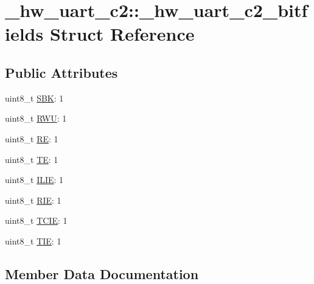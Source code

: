 \hypertarget{struct__hw__uart__c2_1_1__hw__uart__c2__bitfields}{}\section{\+\_\+hw\+\_\+uart\+\_\+c2\+:\+:\+\_\+hw\+\_\+uart\+\_\+c2\+\_\+bitfields Struct Reference}
\label{struct__hw__uart__c2_1_1__hw__uart__c2__bitfields}
\subsection*{Public Attributes}
\begin{DoxyCompactItemize}
\item 
uint8\+\_\+t \hyperlink{struct__hw__uart__c2_1_1__hw__uart__c2__bitfields_a04c3e2e389689b94e32be5cb78bbb247}{S\+BK}\+: 1
\item 
uint8\+\_\+t \hyperlink{struct__hw__uart__c2_1_1__hw__uart__c2__bitfields_a1a364a97336cba5d342508591b620b6e}{R\+WU}\+: 1
\item 
uint8\+\_\+t \hyperlink{struct__hw__uart__c2_1_1__hw__uart__c2__bitfields_a8c09632eb3f294b7e4a13aaa8dbc7ef6}{RE}\+: 1
\item 
uint8\+\_\+t \hyperlink{struct__hw__uart__c2_1_1__hw__uart__c2__bitfields_a999d24fa7a89d29547dd6bf40a97ab9b}{TE}\+: 1
\item 
uint8\+\_\+t \hyperlink{struct__hw__uart__c2_1_1__hw__uart__c2__bitfields_a9df19feee3a9a4cb63a07e833338ea75}{I\+L\+IE}\+: 1
\item 
uint8\+\_\+t \hyperlink{struct__hw__uart__c2_1_1__hw__uart__c2__bitfields_a1b99839e200d445e83533766f9215d52}{R\+IE}\+: 1
\item 
uint8\+\_\+t \hyperlink{struct__hw__uart__c2_1_1__hw__uart__c2__bitfields_ab76a3d569d21c4eaaa55ad61e12f4f56}{T\+C\+IE}\+: 1
\item 
uint8\+\_\+t \hyperlink{struct__hw__uart__c2_1_1__hw__uart__c2__bitfields_a900e675aadbe62c7f8039ec49597e503}{T\+IE}\+: 1
\end{DoxyCompactItemize}


\subsection{Member Data Documentation}
